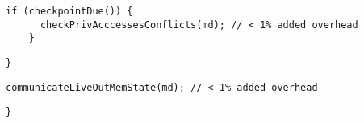   \begin{lstlisting}[morekeywords={pathcost}, aboveskip=0pt,belowskip=0pt,backgroundcolor=\color{lightgray},
  firstnumber=auto, name=dij_checks]
    if (checkpointDue()) {
      checkPrivAcccessesConflicts(md); // < 1% added overhead
    }
  \end{lstlisting}

\begin{lstlisting}[morekeywords={pathcost}, aboveskip=0pt, belowskip=0pt, firstnumber=auto,name=dij_checks]
  }
    \end{lstlisting}

  \begin{lstlisting}[morekeywords={pathcost}, aboveskip=0pt,belowskip=0pt,backgroundcolor=\color{lightgray},
  firstnumber=auto, name=dij_checks]
  communicateLiveOutMemState(md); // < 1% added overhead
  \end{lstlisting}

\begin{lstlisting}[morekeywords={pathcost}, aboveskip=0pt, belowskip=0pt,
firstnumber=auto,name=dij_checks]
}
\end{lstlisting}
